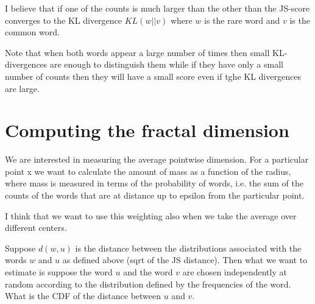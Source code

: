\documentclass{article}
\begin{document}
I believe that if one of the counts is much larger than the other than
the JS-score converges to the KL divergence $KL(w||v)$ where $w$ is
the rare word and $v$ is the common word.

Note that when both words appear a large number of times then small
KL-divergences are enough to distinguish them while if they have only
a small number of counts then they will have a small score even if
tghe KL divergences are large.

\section{Computing the fractal dimension}

We are interested in measuring the average pointwise dimension. For a
particular point x we want to calculate the amount of mass as a
function of the radius, where mass is measured in terms of the
probability of words, i.e. the sum of the counts of the words that are
at distance up to epsilon from the particular point.

I think that we want to use this weighting also when we take the
average over different centers. 

Suppose $d(w,u)$ is the distance between the distributions associated
with the words $w$ and $u$ as defined above (sqrt of the JS
distance). Then what we want to estimate is suppose the word $u$ and
the word $v$ are chosen independently at random according to the
distribution defined by the frequencies of the word. What is the CDF
of the distance between $u$ and $v$.
\end{document}
